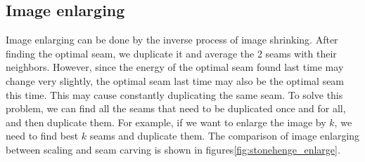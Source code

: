 \documentclass[final]{cvpr}
\begin{document}
\subsection{Image enlarging}
Image enlarging can be done by the inverse process of image shrinking.
After finding the optimal seam, we duplicate it and average the 2 seams with their neighbors.
However, since the energy of the optimal seam found last time may change very slightly, the optimal seam last time may also be the optimal seam this time.
This may cause constantly duplicating the same seam.
To solve this problem, we can find all the seams that need to be duplicated once and for all, and then duplicate them.
For example, if we want to enlarge the image by $k$, we need to find best $k$ seams and duplicate them.
The comparison of image enlarging between scaling and seam carving is shown in figures\ref{fig:stonehenge_enlarge}.
\end{document}

